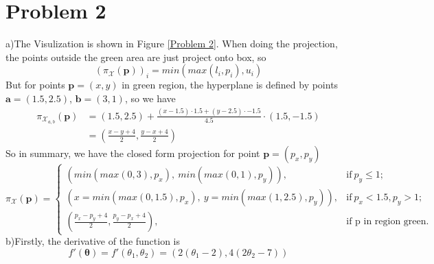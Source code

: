 \documentclass{article}
\begin{document}
\section*{Problem 2}
a)The Visulization is shown in Figure \ref{Problem 2}. When doing the projection, the points outside the green area are just project onto box, so
\begin{equation}
	(\pi_\mathcal{X}(\bm{p}))_i = min(max(l_i, p_i), u_i)
\end{equation}
But for points $\bm{p}=(x,y)$ in green region, the hyperplane is defined by points $\bm{a}=(1.5, 2.5)$, $\bm{b}=(3,1)$, so we have
\begin{equation}
	\begin{aligned}
		\pi_{\mathcal{X}_{a,b}}(\bm{p})
		&= (1.5, 2.5) + \frac{(x-1.5)\cdot 1.5 + (y-2.5)\cdot -1.5}{4.5}\cdot (1.5, -1.5)\\
		&= (\frac{x-y+4}{2},\frac{y-x+4}{2})
	\end{aligned}
\end{equation}
So in summary, we have the closed form projection for point $\bm{p} = (p_x, p_y)$
\begin{equation}
\pi_\mathcal{X}(\bm{p})=
\begin{cases}
	(min(max(0, 3), p_x),\ min(max(0, 1), p_y)), & \text{if}\ p_y \leq 1;\\
	(x=min(max(0,1.5), p_x),\ y=min(max(1, 2.5), p_y)), & \text{if}\ p_x<1.5, p_y >1;\\
	(\frac{p_x-p_y+4}{2},\frac{p_y-p_x+4}{2}), & \text{if p in region green}. 
\end{cases}
\end{equation}
b)Firstly, the derivative of the function is 
\begin{equation}
	f'(\bm{\theta}) = f'(\theta_1, \theta_2) = (2(\theta_1-2), 4(2\theta_2-7))
\end{equation}
\end{document}

